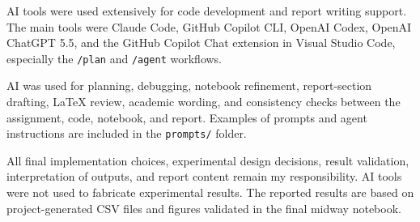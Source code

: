 
AI tools were used extensively for code development and report writing support. The main tools were Claude Code, GitHub Copilot CLI, OpenAI Codex, OpenAI ChatGPT 5.5, and the GitHub Copilot Chat extension in Visual Studio Code, especially the \texttt{/plan} and \texttt{/agent} workflows.

AI was used for planning, debugging, notebook refinement, report-section drafting, LaTeX review, academic wording, and consistency checks between the assignment, code, notebook, and report. Examples of prompts and agent instructions are included in the \texttt{prompts/} folder.

All final implementation choices, experimental design decisions, result validation, interpretation of outputs, and report content remain my responsibility. AI tools were not used to fabricate experimental results. The reported results are based on project-generated CSV files and figures validated in the final midway notebook.
